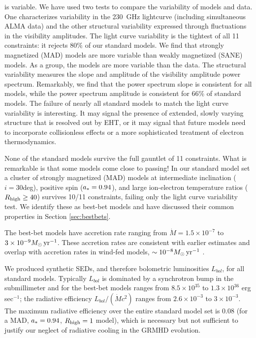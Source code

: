 \sgra is variable.  We have used two tests to compare the variability of models and data. One characterizes variability in the 230~GHz lightcurve (including simultaneous ALMA data) and the other structural variability expressed through fluctuations in the visibility amplitudes.  The light curve variability is the tightest of all 11 constraints: it rejects $80\%$ of our standard models.  We find that strongly magnetized (MAD) models are more variable than weakly magnetized (SANE) models.  As a group, the models are more variable than the data.  The structural variability measures the slope and amplitude of the visibility amplitude power spectrum.  Remarkably, we find that the power spectrum slope is consistent for all models, while the power spectrum amplitude is consistent for 66\% of standard models.  The failure of nearly all standard models to match the light curve variability is interesting.  It may signal the presence of extended, slowly varying structure that is resolved out by EHT, or it may signal that future models need to incorporate collisionless effects or a more sophisticated treatment of electron thermodynamics.   

None of the standard models survive the full gauntlet of 11 constraints.  What is remarkable is that some models come close to passing!  In our standard model set a cluster of strongly magnetized (MAD) models at intermediate inclination ($i = 30$deg), positive spin ($a_* = 0.94$), and large ion-electron temperature ratios ($R_\mathrm{high} \ge 40$) survives 10/11 constraints, failing only the light curve variability test.  We identify these as best-bet models and have discussed their common properties in Section \ref{sec:bestbets}.

The best-bet models have accretion rate ranging from $\dot{M} = 1.5 \times 10^{-7}$ to $3 \times 10^{-9} M_\odot \,\mathrm{yr}^{-1}$.  These accretion rates are consistent with earlier estimates and overlap with accretion rates in wind-fed models, $\sim 10^{-8} M_\odot\,\mathrm{yr}^{-1}$ \citep{2020ApJ...896L...6R}.  

We produced synthetic SEDs, and therefore bolometric luminosities $L_{bol}$, for all  standard models.  Typically $L_{bol}$ is dominated by a synchrotron bump in the submillimeter and for the best-bet models ranges from $ 8.5\times10^{35}$ to $1.3\times10^{36}$ erg sec$^{-1}$; the radiative  efficiency $L_{bol}/(\dot{M} c^2)$ ranges from $2.6\times10^{-3}$ to $3\times10^{-3}$.  The maximum radiative efficiency over the entire standard model set is $0.08$ (for a MAD, $a_* = 0.94$, $R_\mathrm{high} = 1$ model), which is necessary but not sufficient to justify our neglect of radiative cooling in the GRMHD evolution.  

